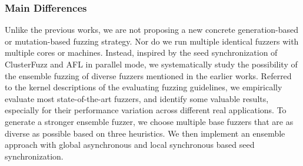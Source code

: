 \begin{comment}
\subsubsection{Ensemble Learning}
Ensemble learning is a machine learning paradigm where multiple learners are trained to solve the same problem \cite{alpaydin2009introduction}. In contrast to ordinary machine learning approaches which try to learn one hypothesis from training data, ensemble methods try to construct a set of hypotheses and combine them for precision.
The diversity of base learners \cite{galar2012review} and the concrete ensemble methods \cite{zhou2012ensemble} are the two cores of ensemble learning. How to select base learners with great diversity and how to combine these base learners together are critical to the performance of ensemble learners. Many researches focus on these two parts to improve the generalization ability and the prediction accuracy of ensemble learners \cite{schapire1990strength, bauer1999empirical, ting1999issues, ting1999issues}. A number of diversity measures have been designed in ensemble learning \cite{krogh1995neural, kuncheva2003measures}. In addition, there are many effective ensemble methods, such as Boosting \cite{breiman1996bagging}, Bagging \cite{krogh1995neural, freund1997decision} and Stacking \cite{wolpert1992stacked}.
Ensemble learning has achieved a great success in most machine learning areas, contributing to better generalization ability.
\end{comment}


\subsubsection{Main Differences} Unlike the previous works, we are not proposing a new concrete generation-based or mutation-based fuzzing strategy. 
Nor do we run multiple identical fuzzers with multiple cores or machines. Instead, inspired by the seed synchronization of ClusterFuzz and AFL in parallel mode, we systematically study the possibility of the ensemble fuzzing of diverse fuzzers mentioned in the earlier works. Referred to the kernel descriptions of the evaluating fuzzing guidelines\cite{klees2018evaluating}, we empirically evaluate most state-of-the-art fuzzers, and identify some valuable results, especially for their performance variation across different real applications. To generate a stronger ensemble fuzzer, we choose multiple base fuzzers that are as diverse as possible based on three heuristics. We then implement an ensemble approach with global asynchronous and local synchronous based seed synchronization. 

